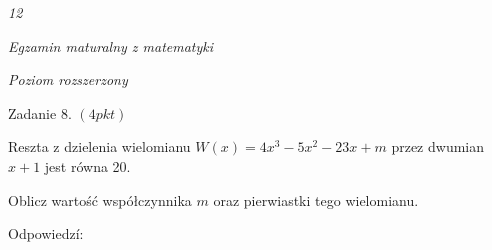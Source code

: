 \documentclass[a4paper,12pt]{article}
\begin{document}
{\it 12}

{\it Egzamin maturalny z matematyki}

{\it Poziom rozszerzony}

Zadanie 8. $(4pkt)$

Reszta z dzielenia wielomianu $W(x)=4x^{3}-5x^{2}-23x+m$ przez dwumian $x+1$ jest równa 20.

Oblicz wartość współczynnika $m$ oraz pierwiastki tego wielomianu.

Odpowiedzí:
\end{document}
